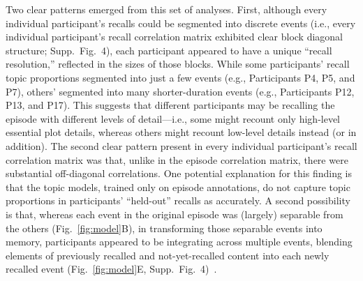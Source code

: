 \documentclass[10pt]{article}
\newcommand{\corrmats}{4}
\begin{document}
Two clear patterns emerged from this set of analyses.  First, although every individual participant's recalls could be segmented into discrete events (i.e., every individual participant's recall correlation matrix exhibited clear block diagonal structure; Supp.\ Fig.~\corrmats), each participant appeared to have a unique ``recall resolution,'' reflected in the sizes of those blocks.  While some participants' recall topic proportions segmented into just a few events (e.g., Participants P4, P5, and P7), others' segmented into many shorter-duration events (e.g., Participants P12, P13, and P17).  This suggests that different participants may be recalling the episode with different levels of detail---i.e., some might recount only high-level essential plot details, whereas others might recount low-level details instead (or in addition).  The second clear pattern present in every individual participant's recall correlation matrix was that, unlike in the episode correlation matrix, there were substantial off-diagonal correlations.  One potential explanation for this finding is that the topic models, trained only on episode annotations, do not capture topic proportions in participants' ``held-out'' recalls as accurately.  A second possibility is that, whereas each event in the original episode was (largely) separable from the others (Fig.~\ref{fig:model}B), in transforming those separable events into memory, participants appeared to be integrating across multiple events, blending elements of previously recalled and not-yet-recalled content into each newly recalled event (Fig.~\ref{fig:model}E, Supp.\ Fig.~\corrmats)~\citep{MannEtal11, HowaEtal12, Mann19}.
\end{document}
